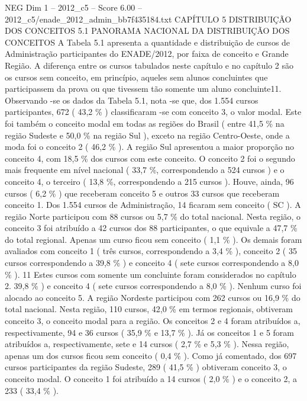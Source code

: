 \begin{textsample}{NEG Dim 1 – 2012\_c5 – Score 6.00 – 2012\_c5/enade\_2012\_admin\_bb7f435184.txt}  \label{ex:f1_neg_327}
CAPÍTULO 5 DISTRIBUIÇÃO DOS CONCEITOS 5.1 PANORAMA NACIONAL DA DISTRIBUIÇÃO DOS CONCEITOS A Tabela 5.1 apresenta a quantidade e distribuição de cursos de Administração participantes do ENADE/2012, por faixa de conceito e Grande Região.
A diferença entre os cursos tabulados neste capítulo e no capítulo 2 são os cursos sem conceito, em princípio, aqueles sem alunos concluintes que participassem da prova ou que tivessem tão somente um aluno concluinte11.
Observando -se os dados da Tabela 5.1, nota -se que, dos 1.554 cursos participantes, 672 ( 43,2 \% ) classificaram -se com conceito 3, o valor modal.
Este foi também o conceito modal em todas as regiões do Brasil ( entre 41,5 \% na região Sudeste e 50,0 \% na região Sul ), exceto na região Centro-Oeste, onde a moda foi o conceito 2 ( 46,2 \% ).
A região Sul apresentou a maior proporção no conceito 4, com 18,5 \% dos cursos com este conceito.
O conceito 2 foi o segundo mais frequente em nível nacional ( 33,7 \%, correspondendo a 524 cursos ) e o conceito 4, o terceiro ( 13,8 \%, correspondendo a 215 cursos ).
Houve, ainda, 96 cursos ( 6,2 \% ) que receberam conceito 5 e outros 33 cursos que receberam conceito 1.
Dos 1.554 cursos de Administração, 14 ficaram sem conceito ( SC ).
A região Norte participou com 88 cursos ou 5,7 \% do total nacional.
Nesta região, o conceito 3 foi atribuído a 42 cursos dos 88 participantes, o que equivale a 47,7 \% do total regional.
Apenas um curso ficou sem conceito ( 1,1 \% ).
Os demais foram avaliados com conceito 1 ( três cursos, correspondendo a 3,4 \% ), conceito 2 ( 35 cursos correspondendo a 39,8 \% ) e conceito 4 ( sete cursos correspondendo a 8,0 \% ). 11 Estes cursos com somente um concluinte foram considerados no capítulo 2. 39,8 \% ) e conceito 4 ( sete cursos correspondendo a 8,0 \% ).
Nenhum curso foi alocado ao conceito 5.
A região Nordeste participou com 262 cursos ou 16,9 \% do total nacional.
Nesta região, 110 cursos, 42,0 \% em termos regionais, obtiveram conceito 3, o conceito modal para a região.
Os conceitos 2 e 4 foram atribuídos a, respectivamente, 94 e 36 cursos ( 35,9 \% e 13,7 \% ).
Já os conceitos 1 e 5 foram atribuídos a, respectivamente, sete e 14 cursos ( 2,7 \% e 5,3 \% ).
Nessa região, apenas um dos cursos ficou sem conceito ( 0,4 \% ).
Como já comentado, dos 697 cursos participantes da região Sudeste, 289 ( 41,5 \% ) obtiveram conceito 3, o conceito modal.
O conceito 1 foi atribuído a 14 cursos ( 2,0 \% ) e o conceito 2, a 233 ( 33,4 \% ).

\end{textsample}
